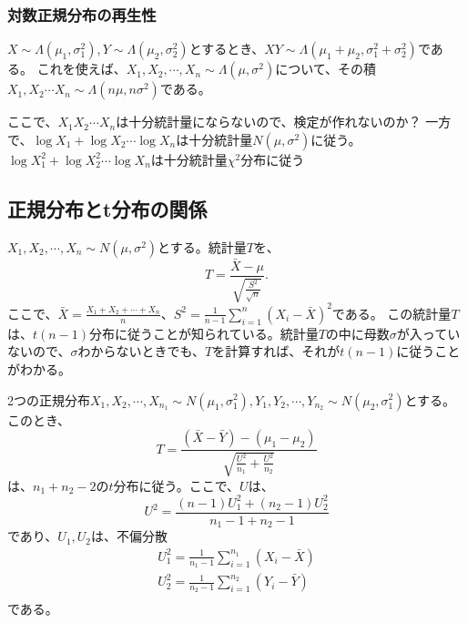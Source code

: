 \subsubsection{対数正規分布の再生性}
$X\sim \Lambda(\mu_1,\sigma_1^2), Y\sim \Lambda(\mu_2,\sigma^2_2)$とするとき、$XY\sim\Lambda(\mu_1+\mu_2,\sigma_1^2+\sigma_2^2)$である。
これを使えば、$X_1,X_2,\cdots,X_n \sim \Lambda(\mu,\sigma^2)$について、その積$X_1,X_2\cdots X_n \sim \Lambda(n\mu,n\sigma^2)$である。

ここで、$X_1X_2\cdots X_n$は十分統計量にならないので、検定が作れないのか？
一方で、$\log X_1+\log X_2 \cdots \log X_n $は十分統計量$N(\mu,\sigma^2)$に従う。
$\log X_1^2+\log X_2^2 \cdots \log X_n $は十分統計量$\chi^2$分布に従う
\fi

\subsection{正規分布とt分布の関係}
$X_1,X_2,\cdots,X_n \sim N(\mu,\sigma^2)$とする。統計量$T$を、
\begin{equation*}
    T = \frac{\bar{X}-\mu}{\sqrt{\frac{S^2}{\sqrt{n}}}}.
\end{equation*}
ここで、$\bar{X}=\frac{X_1+X_2+\cdots+X_n}{n}$、$S^2=\frac{1}{n-1}\sum_{i=1}^{n}(X_i-\bar{X})^2$である。
この統計量$T$は、$t(n-1)$分布に従うことが知られている。統計量$T$の中に母数$\sigma$が入っていないので、$\sigma$わからないときでも、$T$を計算すれば、それが$t(n-1)$に従うことがわかる。

2つの正規分布$X_1,X_2,\cdots,X_{n_1} \sim N(\mu_1,\sigma_1^2), Y_1,Y_2,\cdots,Y_{n_2}\sim N(\mu_2,\sigma_1^2)$とする。このとき、
\begin{equation*}
    T = \frac{(\bar{X}-\bar{Y})-(\mu_1-\mu_2)}{\sqrt{\frac{U^2}{n_1}+\frac{U^2}{n_2}}}
\end{equation*}
は、$n_1+n_2-2$の$t$分布に従う。ここで、$U$は、
\begin{equation*}
    U^2 = \frac{(n-1)U_1^2+(n_2-1)U_2^2}{n_1-1+n_2-1}
\end{equation*}
であり、$U_1,U_2$は、不偏分散
\begin{eqnarray*}
    U_1^2 = \frac{1}{n_1-1}\sum_{i=1}^{n_1}(X_i-\bar{X})\\
    U_2^2 = \frac{1}{n_2-1}\sum_{i=1}^{n_2}(Y_i-\bar{Y})\\
\end{eqnarray*}
である。

